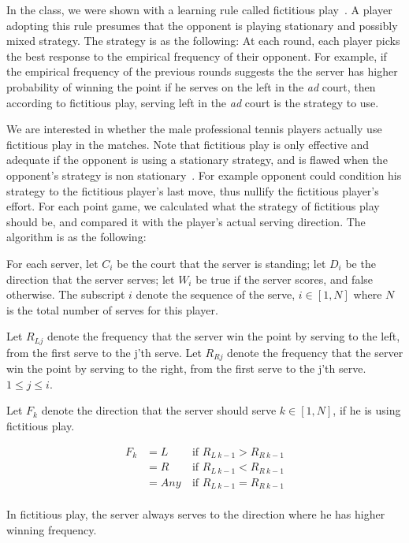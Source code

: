 \documentclass[11pt]{article}
\begin{document}
In the class, we were shown with a learning rule called fictitious play~\cite{berger2007brown}. A player adopting this rule presumes that the opponent is playing stationary and possibly mixed strategy. The strategy is as the following: At each round, each player picks the best response to the empirical frequency of their opponent. For example, if the empirical frequency of the previous rounds suggests the the server has higher probability of winning the point if he serves on the left in the \emph{ad} court, then according to fictitious play, serving left in the \emph{ad} court is the strategy to use. 

We are interested in whether the male professional tennis players actually use fictitious play in the matches. Note that fictitious play is only effective and adequate if the opponent is using a stationary strategy, and is flawed when the opponent's strategy is non stationary~\cite{berger2007brown}. For example opponent could condition his strategy to the fictitious player's last move, thus nullify the fictitious player's effort. For each point game, we calculated what the strategy of fictitious play should be, and compared it with the player's actual serving direction. The algorithm is as the following:

For each server, let $C_i$ be the court that the server is standing; let $D_i$ be the direction that the server serves; let $W_i$ be true if the server scores, and false otherwise. The subscript $i$ denote the sequence of the serve, $i\in [1, N]$ where $N$ is the total number of serves for this player. 

Let $R_{Lj}$ denote the frequency that the server win the point by serving to the left, from the first serve to the j'th serve. Let $R_{Rj}$ denote the frequency that the server win the point by serving to the right, from the first serve to the j'th serve. $1 \leq j \leq i$. 

Let $F_k$ denote the direction that the server should serve $k\in [1, N]$, if he is using fictitious play.

\[
\begin{aligned}
F_k & = L & ~\mbox{if $R_{L~k-1} > R_{R~k-1}$} \\
    & = R & ~\mbox{if $R_{L~k-1} < R_{R~k-1}$} \\
    & = Any & ~\mbox{if $R_{L~k-1} = R_{R~k-1}$} \\
\end{aligned}
\]

In fictitious play, the server always serves to the direction where he has higher winning frequency. 
\end{document}
